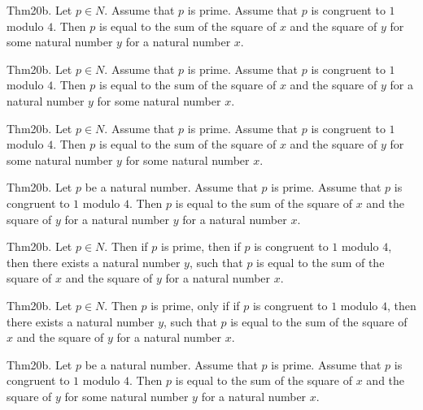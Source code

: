 \documentclass{article}
\begin{document}
Thm20b. Let $p \in N$. Assume that $p$ is prime. Assume that $p$ is congruent to $1$ modulo $4$. Then $p$ is equal to the sum of the square of $x$ and the square of $y$ for some natural number $y$ for a natural number $x$.

Thm20b. Let $p \in N$. Assume that $p$ is prime. Assume that $p$ is congruent to $1$ modulo $4$. Then $p$ is equal to the sum of the square of $x$ and the square of $y$ for a natural number $y$ for some natural number $x$.

Thm20b. Let $p \in N$. Assume that $p$ is prime. Assume that $p$ is congruent to $1$ modulo $4$. Then $p$ is equal to the sum of the square of $x$ and the square of $y$ for some natural number $y$ for some natural number $x$.

Thm20b. Let $p$ be a natural number. Assume that $p$ is prime. Assume that $p$ is congruent to $1$ modulo $4$. Then $p$ is equal to the sum of the square of $x$ and the square of $y$ for a natural number $y$ for a natural number $x$.

Thm20b. Let $p \in N$. Then if $p$ is prime, then if $p$ is congruent to $1$ modulo $4$, then there exists a natural number $y$, such that $p$ is equal to the sum of the square of $x$ and the square of $y$ for a natural number $x$.

Thm20b. Let $p \in N$. Then $p$ is prime, only if if $p$ is congruent to $1$ modulo $4$, then there exists a natural number $y$, such that $p$ is equal to the sum of the square of $x$ and the square of $y$ for a natural number $x$.

Thm20b. Let $p$ be a natural number. Assume that $p$ is prime. Assume that $p$ is congruent to $1$ modulo $4$. Then $p$ is equal to the sum of the square of $x$ and the square of $y$ for some natural number $y$ for a natural number $x$.
\end{document}
